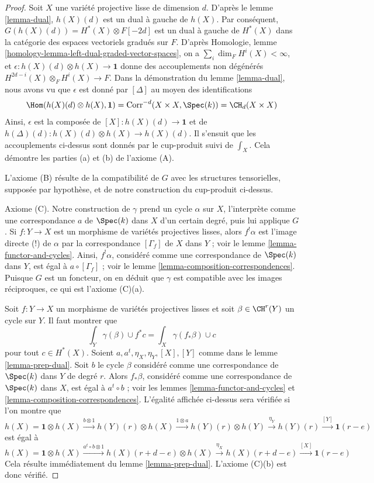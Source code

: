 \begin{proof}
\medskip\noindent
Soit $X$ une variété projective lisse de dimension $d$.
D'après le lemme \ref{lemma-dual},
$h(X)(d)$ est un dual à gauche de $h(X)$. Par conséquent,
$G(h(X)(d)) = H^*(X) \otimes F[-2d]$ est un dual à gauche de
$H^*(X)$ dans la catégorie des espaces vectoriels gradués sur $F$.
D'après Homologie, lemme \ref{homology-lemma-left-dual-graded-vector-spaces},
on a $\sum_i \dim_F H^i(X) < \infty$, et
$\epsilon : h(X)(d) \otimes h(X) \to \mathbf{1}$ donne
des accouplements non dégénérés $H^{2d - i}(X) \otimes_F H^i(X) \to F$.
Dans la démonstration du lemme \ref{lemma-dual}, nous avons vu que
$\epsilon$ est donné par $[\Delta]$ au moyen des identifications
$$
\Hom(h(X)(d) \otimes h(X), \mathbf{1}) =
\text{Corr}^{-d}(X \times X, \Spec(k)) =
\CH_d(X \times X)
$$
Ainsi, $\epsilon$ est la composée de $[X] : h(X)(d) \to \mathbf{1}$
et de $h(\Delta)(d) : h(X)(d) \otimes h(X) \to h(X)(d)$. Il s'ensuit
que les accouplements ci-dessus sont donnés par le cup-produit suivi de
$\int_X$. Cela démontre les parties (a) et (b) de l'axiome (A).

\medskip\noindent
L'axiome (B) résulte de la compatibilité de $G$ avec les structures
tensorielles, supposée par hypothèse, et de notre construction du cup-produit ci-dessus.

\medskip\noindent
Axiome (C). Notre construction de $\gamma$ prend un cycle $\alpha$ sur $X$,
l'interprète comme une correspondance $a$ de $\Spec(k)$ dans $X$ d'un certain degré,
puis lui applique $G$. Si $f : Y \to X$ est un morphisme de variétés projectives
lisses, alors $f^!\alpha$ est l'image directe (!) de $\alpha$
par la correspondance $[\Gamma_f]$ de $X$ dans $Y$ ; voir
le lemme \ref{lemma-functor-and-cycles}. Ainsi,
$f^!\alpha$, considéré comme une correspondance de $\Spec(k)$ dans $Y$,
est égal à $a \circ [\Gamma_f]$ ; voir
le lemme \ref{lemma-composition-correspondences}.
Puisque $G$ est un foncteur, on en déduit que
$\gamma$ est compatible avec les images réciproques, ce qui est l'axiome (C)(a).

\medskip\noindent
Soit $f : Y \to X$ un morphisme de variétés projectives lisses et
soit $\beta \in \CH^r(Y)$ un cycle sur $Y$. Il faut montrer que
$$
\int_Y \gamma(\beta) \cup f^*c = \int_X \gamma(f_*\beta) \cup c
$$
pour tout $c \in H^*(X)$. Soient $a, a^t, \eta_X, \eta_Y, [X], [Y]$
comme dans le lemme \ref{lemma-prep-dual}.
Soit $b$ le cycle $\beta$ considéré comme une correspondance de $\Spec(k)$ dans $Y$
de degré $r$. Alors $f_*\beta$, considéré comme une correspondance de
$\Spec(k)$ dans $X$, est égal à $a^t \circ b$ ; voir
les lemmes \ref{lemma-functor-and-cycles} et
\ref{lemma-composition-correspondences}.
L'égalité affichée ci-dessus sera vérifiée si l'on montre que
$$
h(X) = \mathbf{1} \otimes h(X)
\xrightarrow{b \otimes 1}
h(Y)(r) \otimes h(X)
\xrightarrow{1 \otimes a}
h(Y)(r) \otimes h(Y)
\xrightarrow{\eta_Y}
h(Y)(r)
\xrightarrow{[Y]}
\mathbf{1}(r - e)
$$
est égal à
$$
h(X) = \mathbf{1} \otimes h(X)
\xrightarrow{a^t \circ b \otimes 1}
h(X)(r + d - e) \otimes h(X)
\xrightarrow{\eta_X}
h(X)(r + d - e)
\xrightarrow{[X]}
\mathbf{1}(r - e)
$$
Cela résulte immédiatement du lemme \ref{lemma-prep-dual}.
L'axiome (C)(b) est donc vérifié.


\end{proof}
